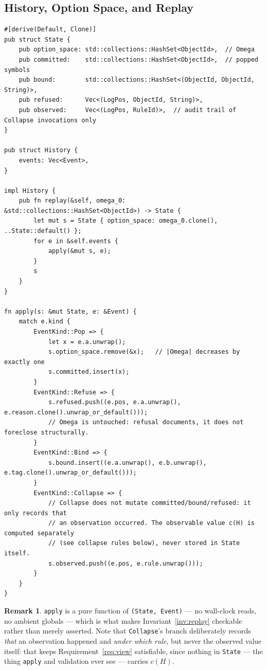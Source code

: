\documentclass[12pt]{article}
\theoremstyle{definition}
\newtheorem{remark}{Remark}
\newcommand{\Hist}{H}
\begin{document}
\subsection{History, Option Space, and Replay}

\begin{verbatim}
#[derive(Default, Clone)]
pub struct State {
    pub option_space: std::collections::HashSet<ObjectId>,  // Omega
    pub committed:    std::collections::HashSet<ObjectId>,  // popped symbols
    pub bound:        std::collections::HashSet<(ObjectId, ObjectId, String)>,
    pub refused:      Vec<(LogPos, ObjectId, String)>,
    pub observed:     Vec<(LogPos, RuleId)>,  // audit trail of Collapse invocations only
}

pub struct History {
    events: Vec<Event>,
}

impl History {
    pub fn replay(&self, omega_0: &std::collections::HashSet<ObjectId>) -> State {
        let mut s = State { option_space: omega_0.clone(), ..State::default() };
        for e in &self.events {
            apply(&mut s, e);
        }
        s
    }
}

fn apply(s: &mut State, e: &Event) {
    match e.kind {
        EventKind::Pop => {
            let x = e.a.unwrap();
            s.option_space.remove(&x);   // |Omega| decreases by exactly one
            s.committed.insert(x);
        }
        EventKind::Refuse => {
            s.refused.push((e.pos, e.a.unwrap(), e.reason.clone().unwrap_or_default()));
            // Omega is untouched: refusal documents, it does not foreclose structurally.
        }
        EventKind::Bind => {
            s.bound.insert((e.a.unwrap(), e.b.unwrap(), e.tag.clone().unwrap_or_default()));
        }
        EventKind::Collapse => {
            // Collapse does not mutate committed/bound/refused: it only records that
            // an observation occurred. The observable value c(H) is computed separately
            // (see collapse rules below), never stored in State itself.
            s.observed.push((e.pos, e.rule.unwrap()));
        }
    }
}
\end{verbatim}

\begin{remark}
\texttt{apply} is a pure function of \texttt{(State, Event)} — no wall-clock reads, no ambient globals — which is what makes Invariant~\ref{inv:replay} checkable rather than merely asserted. Note that \texttt{Collapse}'s branch deliberately records \emph{that} an observation happened and \emph{under which rule}, but never the observed value itself: that keeps Requirement~\ref{req:view} satisfiable, since nothing in \texttt{State} — the thing \texttt{apply} and validation ever see — carries $c(\Hist)$.
\end{remark}
\end{document}
